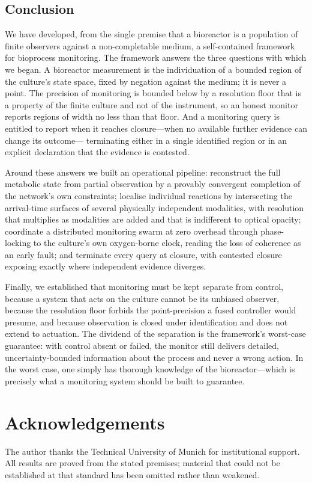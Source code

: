 \documentclass[11pt,twocolumn,a4paper]{article}
\theoremstyle{thmstyle}
\theoremstyle{definition}
\theoremstyle{remark}
\begin{document}
\subsection{Conclusion}

We have developed, from the single premise that a bioreactor is a population
of finite observers against a non-completable medium, a self-contained
framework for bioprocess monitoring. The framework answers the three
questions with which we began. A bioreactor measurement is the individuation
of a bounded region of the culture's state space, fixed by negation against
the medium; it is never a point. The precision of monitoring is bounded below
by a resolution floor that is a property of the finite culture and not of the
instrument, so an honest monitor reports regions of width no less than that
floor. And a monitoring query is entitled to report when it reaches
closure---when no available further evidence can change its outcome---
terminating either in a single identified region or in an explicit
declaration that the evidence is contested.

Around these answers we built an operational pipeline: reconstruct the full
metabolic state from partial observation by a provably convergent completion
of the network's own constraints; localise individual reactions by
intersecting the arrival-time surfaces of several physically independent
modalities, with resolution that multiplies as modalities are added and that
is indifferent to optical opacity; coordinate a distributed monitoring swarm
at zero overhead through phase-locking to the culture's own oxygen-borne
clock, reading the loss of coherence as an early fault; and terminate every
query at closure, with contested closure exposing exactly where independent
evidence diverges.

Finally, we established that monitoring must be kept separate from control,
because a system that acts on the culture cannot be its unbiased observer,
because the resolution floor forbids the point-precision a fused controller
would presume, and because observation is closed under identification and
does not extend to actuation. The dividend of the separation is the
framework's worst-case guarantee: with control absent or failed, the monitor
still delivers detailed, uncertainty-bounded information about the process
and never a wrong action. In the worst case, one simply has thorough
knowledge of the bioreactor---which is precisely what a monitoring system
should be built to guarantee.


\section*{Acknowledgements}
The author thanks the Technical University of Munich for institutional
support. All results are proved from the stated premises; material that
could not be established at that standard has been omitted rather than
weakened.



\end{document}
